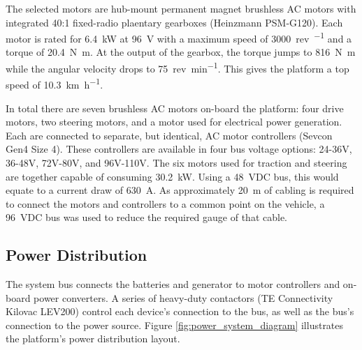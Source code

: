 \documentclass[preprint,authoryear,12pt]{elsarticle}
\begin{document}
        The selected motors are hub-mount permanent magnet brushless AC motors with integrated 40:1 fixed-radio plaentary gearboxes (Heinzmann PSM-G120).
        Each motor is rated for \SI{6.4}{\kilo\watt} at \SI{96}{\volt} with a maximum speed of \SI{3000}{rev\per\min} and a torque of \SI{20.4}{\newton\meter}.
        At the output of the gearbox, the torque jumps to \SI{816}{\newton\meter} while the angular velocity drops to \SI{75}{rev\per\minute}.
        This gives the platform a top speed of \SI{10.3}{\kilo\meter\per\hour}.


        In total there are seven brushless AC motors on-board the platform: four drive motors, two steering motors, and a motor used for electrical power generation.
        Each are connected to separate, but identical, AC motor controllers (Sevcon Gen4 Size 4).
        These controllers are available in four bus voltage options: 24-36V, 36-48V, 72V-80V, and 96V-110V.
        The six motors used for traction and steering are together capable of consuming \SI{30.2}{\kilo\watt}.
        Using a \SI{48}{\volt}DC bus, this would equate to a current draw of \SI{630}{\ampere}.
        As approximately \SI{20}{\meter} of cabling is required to connect the motors and controllers to a common point on the vehicle, a \SI{96}{\volt}DC bus was used to reduce the required gauge of that cable.


    \subsection{Power Distribution}
    \label{sub:power}
        The system bus connects the batteries and generator to motor controllers and on-board power converters.
        A series of heavy-duty contactors (TE Connectivity Kilovac LEV200) control each device's connection to the bus, as well as the bus's connection to the power source.
        Figure \ref{fig:power_system_diagram} illustrates the platform's power distribution layout.
\end{document}
